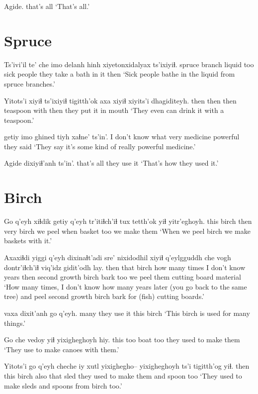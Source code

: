 \documentclass[12pt]{article}
\begin{document}
\gll Agide.
{{that's all}}
\glt `That's all.'
\glend

\section{Spruce}

\gll Ts'ivi'il te' che {imo delanh hinh} xiyetonxidalyax ts'ixiyiɬ.
{spruce branch} liquid too {sick people} {they take a bath in it} then
\glt `Sick people bathe in the liquid from spruce branches.'
\glend

\gll Yitots'i xiyiɬ ts'ixiyiɬ tigitth'ok axa xiyiɬ {xiyits'i dhagiditeyh.}
then then then teaspoon with then {they put it in mouth}
\glt `They even can drink it with a teaspoon.'
\glend

 getiy {imo ghined} tiyh xaɬne' ts'in'.
{I don't know what} very medicine powerful {they said}
\glt `They say it's some kind of really powerful medicine.'
\glend

\gll Agide dixiyiɬ'anh ts'in'.
{that's all} {they use it}
\glt `That's how they used it.'
\glend

\section{Birch}

\gll Go q'eyh xiɬdik getiy  q'eyh tr'itiɬch'iɬ tux tetth'ok yiɬ yitr'eghoyh.
this birch then very birch {we peel} when basket too {we make them}
\glt `When we peel birch we make baskets with it.'
\glend

\gll Axaxiɬdi yiggi q'eyh dixinaɬt'adi sre'           nixidodhil xiyiɬ q'eylgguddh         che {vogh dontr'iɬch'iɬ} {viq'idz gidit'odh} lay.                 
then    that birch {how many times} {I don't know} {years} then  {second growth birch bark} too {we peel them}  {cutting board} material
\glt `How many times, I don't know how many years later (you go back to the same tree) and peel second growth birch bark for (fish) cutting boards.'
\glend

 {vaxa dixit'anh} go q'eyh.
many            {they use it} this birch
\glt `This birch is used for many things.'
\glend

\gll Go che vedoy yiɬ yixigheghoyh hiy.
this too boat too {they used to make them}
\glt `They use to make canoes with them.'
\glend

\gll Yitots'i go q'eyh cheche iy xutl    yixighegho-- yixigheghoyh ts'i tigitth'og yiɬ.
then     this birch also that sled  {} {they used to make them} and spoon too
\glt `They used to make sleds and spoons from birch too.'
\glend
\end{document}
